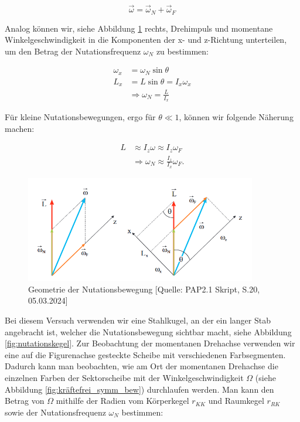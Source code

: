 \documentclass{article}
\begin{document}
\begin{equation}
    \Vec{\omega} = \Vec{\omega}_N + \Vec{\omega}_F
\end{equation}

Analog können wir, siehe Abbildung \ref{fig:krf_symm_geom} rechts, Drehimpuls und momentane Winkelgeschwindigkeit in die Komponenten der x- und z-Richtung unterteilen, um den Betrag der Nutationsfrequenz $\omega_N$ zu bestimmen:

\begin{equation}
    \begin{split}
        \omega_x &= \omega_N \sin{\theta} \\
        L_x &= L \sin{\theta} = I_x \omega_x \\
        &\Rightarrow \omega_N = \frac{L}{I_x}
    \end{split}
\end{equation}

Für kleine Nutationsbewegungen, ergo für $\theta \ll 1$, können wir folgende Näherung machen:

\begin{equation}
    \begin{split}
        L &\approx I_z \omega \approx I_z \omega_F \\
        &\Rightarrow \omega_N \approx \frac{I_z}{I_x} \omega_F.
    \end{split}
    \label{eq:w_n-w_f}
\end{equation}

\begin{figure}[!h]
    \centering
    \includegraphics[width=0.9\textwidth]{graphics/krf_symm_zerleg.png}
    \caption{Geometrie der Nutationsbewegung [Quelle: PAP2.1 Skript, S.20, 05.03.2024]}
    \label{fig:krf_symm_geom}
\end{figure}

\phantom{.}

Bei diesem Versuch verwenden wir eine Stahlkugel, an der ein langer Stab angebracht ist, welcher die Nutationsbewegung sichtbar macht, siehe Abbildung \ref{fig:nutationskegel}. Zur Beobachtung der momentanen Drehachse verwenden wir eine auf die Figurenachse gesteckte Scheibe mit verschiedenen Farbsegmenten. Dadurch kann man beobachten, wie am Ort der momentanen Drehachse die einzelnen Farben der Sektorscheibe mit der Winkelgeschwindigkeit $\Omega$ (siehe Abbildung \ref{fig:kräftefrei_symm_bew}) durchlaufen werden. Man kann den Betrag von $\Omega$ mithilfe der Radien vom Körperkegel $r_{KK}$ und Raumkegel $r_{RK}$ sowie der Nutationsfrequenz $\omega_N$ bestimmen:
\end{document}
